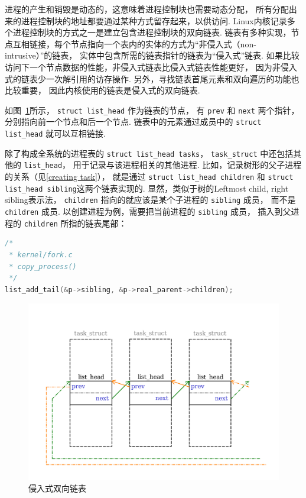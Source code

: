 进程的产生和销毁是动态的，这意味着进程控制块也需要动态分配，
所有分配出来的进程控制块的地址都要通过某种方式留存起来，以供访问.
Linux内核记录多个进程控制块的方式之一是建立包含进程控制块的双向链表.
链表有多种实现，节点互相链接，每个节点指向一个表内的实体的方式为“非侵入式（non-intrusive）”的链表，
实体中包含所需的链表指针的链表为“侵入式”链表.
如果比较访问下一个节点数据的性能，非侵入式链表比侵入式链表性能更好，
因为非侵入式的链表少一次解引用的访存操作.
另外，寻找链表首尾元素和双向遍历的功能也比较重要，
因此内核使用的链表是侵入式的双向链表.

如图~\ref{fig:task_list}所示，
\lstinline{struct list_head} 作为链表的节点，
有 \lstinline{prev} 和 \lstinline{next} 两个指针，
分别指向前一个节点和后一个节点.
链表中的元素通过成员中的 \lstinline{struct list_head} 就可以互相链接.

除了构成全系统的进程表的 \lstinline{struct list_head tasks}，
\lstinline{task_struct} 中还包括其他的 \lstinline{list_head}，
用于记录与该进程相关的其他进程.
比如，记录树形的父子进程的关系（见\ref{creating task}），
就是通过 \lstinline{struct list_head children}
和 \lstinline{struct list_head sibling}这两个链表实现的.
显然，类似于树的Leftmost child, right sibling表示法\cite{sedgewick2001algorithms}，
\lstinline{children} 指向的就应该是某个子进程的 \lstinline{sibling} 成员，
而不是 \lstinline{children} 成员.
以创建进程为例，需要把当前进程的 \lstinline{sibling} 成员，
插入到父进程的 \lstinline{children} 所指的链表尾部：
\begin{lstlisting}[language=C]
/*
 * kernel/fork.c
 * copy_process()
 */
list_add_tail(&p->sibling, &p->real_parent->children);
\end{lstlisting}
\begin{figure}[]
	\centering
	\includegraphics[width=\textwidth]{img/intrusive_list.pdf}
	\caption{\label{fig:task_list} 侵入式双向链表}
\end{figure}

